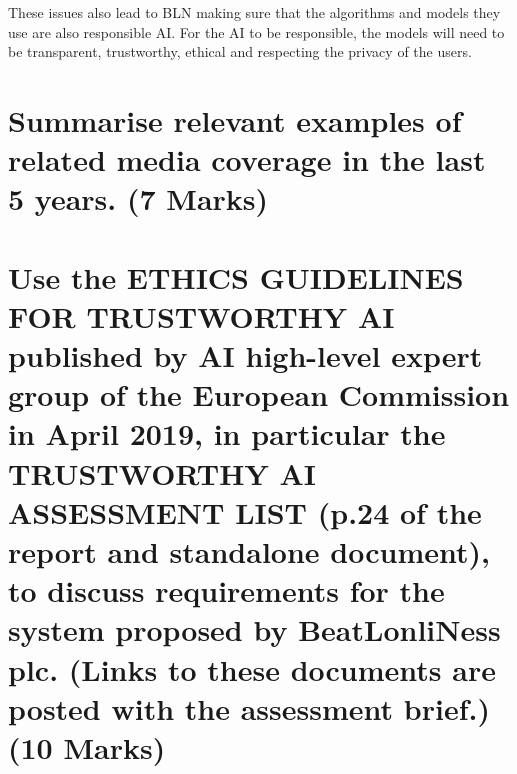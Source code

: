 \documentclass[a4paper,10pt]{article}
\begin{document}
These issues also lead to BLN making sure that the algorithms and models they use are also responsible AI. For the AI to be responsible, the models will need to be transparent, trustworthy, ethical and respecting the privacy of the users. 


\section{Summarise relevant examples of related media coverage in the last 5 years. (7 Marks)}


	

\section{Use the ETHICS GUIDELINES FOR TRUSTWORTHY AI published by AI high-level expert group of the European Commission in April 2019, in particular the TRUSTWORTHY AI ASSESSMENT LIST (p.24 of the report and standalone document), to discuss requirements for the system proposed by BeatLonliNess plc. (Links to these documents are posted with the assessment brief.) (10 Marks)}

	
\medskip
\newpage
	
	




\end{document}

